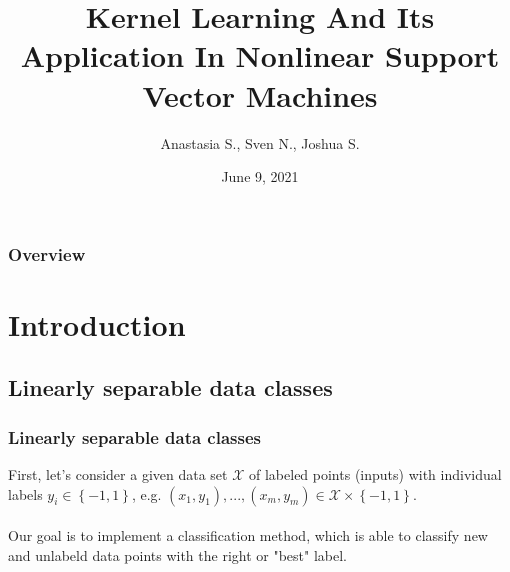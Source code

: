 \documentclass{beamer}
\title[Kernel Learning]{Kernel Learning And Its Application In Nonlinear Support Vector Machines} %
\author{Anastasia S., Sven N., Joshua S.} %
\institute[] %
{
Otto-Friedrich-University Bamberg \\ %
\medskip
\textit{anastasia.sinitsyna@stud.uni-bamberg.de \\}
\textit{sven-jason-waldemar.nekula@stud.uni-bamberg.de \\} %
\textit{joshua-guenter.simon@stud.uni-bamberg.de} %
}
\date{June 9, 2021} %
\begin{document}
\begin{frame}
\titlepage %
\end{frame}

\begin{frame}
\frametitle{Overview} %
\tableofcontents %
\end{frame}



\section{Introduction} 

\subsection{Linearly separable data classes}

\begin{frame}{}
    \frametitle{Linearly separable data classes}
    First, let's consider a given data set $\mathcal{X}$ of labeled points (inputs) with individual labels $y_i \in \left\{ -1,1 \right\}$, e.g. $(x_1,y_1), ..., (x_m, y_m) \in \mathcal{X} \times \left\{ -1,1 \right\}$. \\~\\
    
    Our goal is to implement a classification method, which is able to classify new and unlabeld data points with the right or "best" label. \\~\\
\end{frame}
\end{document}
